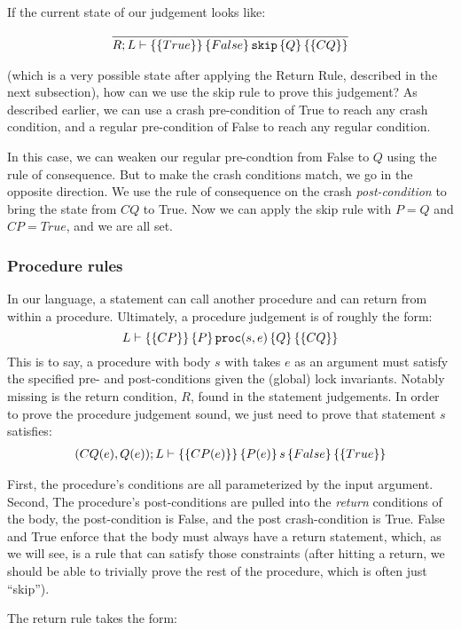 If the current state of our judgement looks like:

\begin{gather*}
\infer{\hoarestmt{R}{L}{True}{False}{\texttt{skip}}{Q}{CQ}}{}
\end{gather*}

(which is a very possible state after applying the Return Rule, described in the
next subsection), how can we use the skip rule to prove this judgement? As
described earlier, we can use a crash pre-condition of True to reach any crash
condition, and a regular pre-condition of False to reach any regular condition.

In this case, we can weaken our regular pre-condtion from False to $Q$
using the rule of consequence. But to make the crash conditions match, we go in
the opposite direction. We use the rule of consequence on the crash
\textit{post-condition} to bring the state from $CQ$ to True. Now we can apply
the skip rule with $P=Q$ and $CP=True$, and we are all set.

\subsubsection{Procedure rules}

In our language, a statement can call another procedure and can return from
within a procedure. Ultimately, a procedure judgement is of roughly the form:
$$L \vdash \left\{\left\{ CP \right\}\right\} \left\{ P \right\} \texttt{proc}(s, e) \left\{ Q \right\} \left\{\left\{ CQ \right\}\right\}$$
This is to say, a procedure with body $s$ with takes $e$ as an argument must
satisfy the specified pre- and post-conditions given the (global) lock
invariants. Notably missing is the return condition, $R$, found in the statement
judgements. In order to prove the procedure judgement sound, we just need to
prove that statement $s$ satisfies:
\begin{gather*}
(CQ(e),Q(e)); L \vdash \left\{\left\{ CP(e) \right\}\right\} \left\{ P(e) \right\} s \left\{ False \right\} \left\{\left\{ True \right\}\right\}
\end{gather*}

First, the procedure's conditions are all parameterized by the input argument.
Second, The procedure's post-conditions are pulled into the \textit{return}
conditions of the body, the post-condition is False, and the post
crash-condition is True. False and True enforce that the body must always have a
return statement, which, as we will see, is a rule that can satisfy those
constraints (after hitting a return, we should be able to trivially prove the
rest of the procedure, which is often just ``skip'').

The return rule takes the form:

